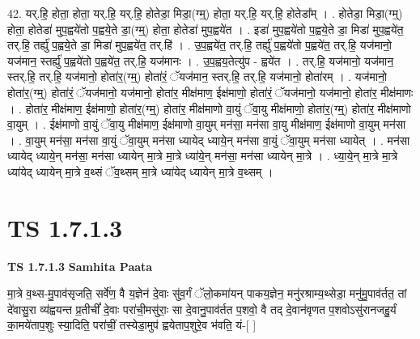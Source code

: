 \documentclass[17pt]{extarticle}
\begin{document}
42. यर्.हि॒ होता॒ होता॒ यर्.हि॒ यर्.हि॒ होतेडा॒ मिडा॒(ग्म्॒) होता॒ यर्.हि॒ यर्.हि॒ होतेडा᳚म् । . होतेडा॒ मिडा॒(ग्म्॒) होता॒ होतेडा॑ मुप॒ह्वये॑तो प॒ह्वये॒ते डा॒(ग्म्॒) होता॒ होतेडा॑ मुप॒ह्वये॑त । . इडा॑ मुप॒ह्वये॑तो प॒ह्वये॒ते डा॒ मिडा॑ मुप॒ह्वये॑त॒ तर्.हि॒ तर्ह्यु॑ प॒ह्वये॒ते डा॒ मिडा॑ मुप॒ह्वये॑त॒ तर्.हि॑ । . उ॒प॒ह्वये॑त॒ तर्.हि॒ तर्ह्यु॑ प॒ह्वये॑तो प॒ह्वये॑त॒ तर्.हि॒ यज॑मानो॒ यज॑मान॒ स्तर्ह्यु॑ प॒ह्वये॑तो प॒ह्वये॑त॒ तर्.हि॒ यज॑मानः । . उ॒प॒ह्वय॒तेत्यु॑प - ह्वये॑त । . तर्.हि॒ यज॑मानो॒ यज॑मान॒ स्तर्.हि॒ तर्.हि॒ यज॑मानो॒ होता॑र॒(ग्म्॒) होता॑रं॒ ॅयज॑मान॒ स्तर्.हि॒ तर्.हि॒ यज॑मानो॒ होता॑रम् । . यज॑मानो॒ होता॑र॒(ग्म्॒) होता॑रं॒ ॅयज॑मानो॒ यज॑मानो॒ होता॑र॒ मीक्ष॑माण॒ ईक्ष॑माणो॒ होता॑रं॒ ॅयज॑मानो॒ यज॑मानो॒ होता॑र॒ मीक्ष॑माणः । . होता॑र॒ मीक्ष॑माण॒ ईक्ष॑माणो॒ होता॑र॒(ग्म्॒) होता॑र॒ मीक्ष॑माणो वा॒युं ॅवा॒यु मीक्ष॑माणो॒ होता॑र॒(ग्म्॒) होता॑र॒ मीक्ष॑माणो वा॒युम् । . ईक्ष॑माणो वा॒युं ॅवा॒यु मीक्ष॑माण॒ ईक्ष॑माणो वा॒युम् मन॑सा॒ मन॑सा वा॒यु मीक्ष॑माण॒ ईक्ष॑माणो वा॒युम् मन॑सा । . वा॒युम् मन॑सा॒ मन॑सा वा॒युं ॅवा॒युम् मन॑सा ध्यायेद् ध्याये॒न् मन॑सा वा॒युं ॅवा॒युम् मन॑सा ध्यायेत् । . मन॑सा ध्यायेद् ध्याये॒न् मन॑सा॒ मन॑सा ध्यायेन् मा॒त्रे मा॒त्रे ध्या॑ये॒न् मन॑सा॒ मन॑सा ध्यायेन् मा॒त्रे । . ध्या॒ये॒न् मा॒त्रे मा॒त्रे ध्या॑येद् ध्यायेन् मा॒त्रे व॒थ्सं ॅव॒थ्सम् मा॒त्रे ध्या॑येद् ध्यायेन् मा॒त्रे व॒थ्सम् । \newline
\pagebreak
{}
\section*{ TS 1.7.1.3 }

\textbf{TS 1.7.1.3 } \newline
\textbf{Samhita Paata} \newline

मा॒त्रे व॒थ्स-मु॒पाव॑सृजति॒ सर्वे॑ण॒ वै य॒ज्ञेन॑ दे॒वाः सु॑व॒र्गं ॅलो॒कमा॑यन् पाकय॒ज्ञेन॒ मनु॑रश्राम्य॒थ्सेडा॒ मनु॑मु॒पाव॑र्तत॒ तां दे॑वासु॒रा व्य॑ह्वयन्त प्र॒तीचीं᳚ दे॒वाः परा॑ची॒मसु॑राः॒ सा दे॒वानु॒पाव॑र्तत प॒शवो॒ वै तद् दे॒वान॑वृणत प॒शवोऽसु॑रानजहु॒र्यं का॒मये॑ताप॒शुः स्या॒दिति॒ परा॑चीं॒ तस्येडा॒मुप॑ ह्वयेताप॒शुरे॒व भ॑वति॒ यं-[ ] \newline
\end{document}
